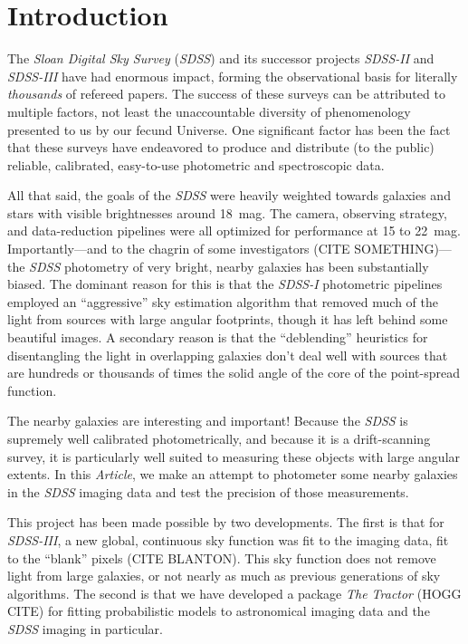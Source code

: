 \documentclass[12pt,preprint,pdftex]{aastex}
\newcommand{\project}[1]{\textsl{#1}}
\newcommand{\documentname}{\textsl{Article}}
\begin{document}
\section{Introduction}
The \project{Sloan Digital Sky Survey} (\project{SDSS}) and its
successor projects \project{SDSS-II} and \project{SDSS-III} have had
enormous impact, forming the observational basis for literally
\emph{thousands} of refereed papers.  The success of these surveys can
be attributed to multiple factors, not least the unaccountable
diversity of phenomenology presented to us by our fecund Universe.
One significant factor has been the fact that these surveys have
endeavored to produce and distribute (to the public) reliable,
calibrated, easy-to-use photometric and spectroscopic data.

All that said, the goals of the \project{SDSS} were heavily weighted
towards galaxies and stars with visible brightnesses around 18~mag.
The camera, observing strategy, and data-reduction pipelines were all
optimized for performance at 15 to 22~mag.  Importantly---and to the
chagrin of some investigators (CITE SOMETHING)---the \project{SDSS}
photometry of very bright, nearby galaxies has been substantially
biased.  The dominant reason for this is that the \project{SDSS-I}
photometric pipelines employed an ``aggressive'' sky estimation
algorithm that removed much of the light from sources with large
angular footprints, though it has left behind some beautiful images.
A secondary reason is that the ``deblending'' heuristics for
disentangling the light in overlapping galaxies don't deal well with
sources that are hundreds or thousands of times the solid angle of the
core of the point-spread function.

The nearby galaxies are interesting and important!  Because the
\project{SDSS} is supremely well calibrated photometrically, and
because it is a drift-scanning survey, it is particularly well suited
to measuring these objects with large angular extents.  In this
\documentname, we make an attempt to photometer some nearby galaxies
in the \project{SDSS} imaging data and test the precision of those
measurements.

This project has been made possible by two developments.  The first is
that for \project{SDSS-III}, a new global, continuous sky function was
fit to the imaging data, fit to the ``blank'' pixels (CITE BLANTON).  This sky
function does not remove light from large galaxies, or not nearly as
much as previous generations of sky algorithms.  The second is that we
have developed a package \project{The Tractor} (HOGG CITE) for fitting
probabilistic models to astronomical imaging data and the
\project{SDSS} imaging in particular.
\end{document}
